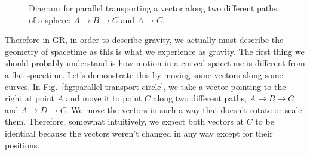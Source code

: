 \begin{bibunit}[unsrtnat]
\begin{figure}[htb]
   \centering
   \caption[Parallel transport on a sphere.]{Diagram for parallel transporting a
      vector along two different paths of a sphere: $A\rightarrow B\rightarrow
      C$ and $A\rightarrow C$.}
   \label{fig:parallel-transport-sphere}
\end{figure}

Therefore in GR, in order to describe gravity, we actually must describe the
geometry of spacetime as this is what we experience as gravity. The first thing
we should probably understand is how motion in a curved spacetime is different from
a flat spacetime. Let's demonstrate this by moving some vectors along some
curves. In Fig.~\ref{fig:parallel-transport-circle}, we take a vector pointing
to the right at point $A$ and move it to point $C$ along two different paths;
$A\rightarrow B\rightarrow C$ and $A\rightarrow D\rightarrow C$. We move the
vectors in such a way that doesn't rotate or scale them. Therefore, somewhat
intuitively, we expect both vectors at $C$ to be identical because the vectors
weren't changed in any way except for their positions.


\end{bibunit}
